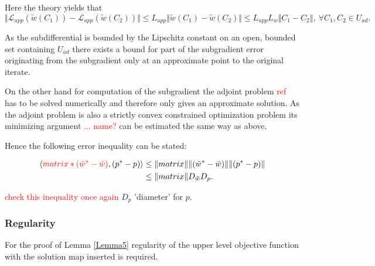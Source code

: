 Here the theory yields that
\[ \Vert \mathcal{L}_{upp}(\tilde{w}(C_1))-\mathcal{L}_{upp}(\tilde{w}(C_2)) \Vert \leq L_{upp}\Vert \tilde{w}(C_1)-\tilde{w}(C_2) \Vert \leq  L_{upp} L_{w}\Vert C_1-C_2\Vert, \ \forall C_1, C_2 \in U_{ad}. \]

As the subdifferential is bounded by the Lipschitz constant on an open, bounded set containing \(U_{ad}\) there exists a bound for part of the subgradient error originating from the subgradient only at an approximate point to the original iterate.

On the other hand for computation of the subgradient the adjoint problem \textcolor{red}{ref} has to be solved numerically and therefore only gives an approximate solution.
As the adjoint problem is also a strictly convex constrained optimization problem its minimizing argument \textcolor{red}{... name?} can be estimated the same way as above.

Hence the following error inequality can be stated:

\begin{align*}
	\left\langle \textcolor{red}{matrix*(\tilde{w}^*-\tilde{w})}, (p^*-p) \right\rangle &\leq \Vert matrix \Vert \Vert(\tilde{w}^*-\tilde{w}) \Vert \Vert (p^*-p) \Vert \\
	& \leq \Vert matrix \Vert D_{\tilde{w}} D_{p}.
\end{align*}

\textcolor{red}{check this inequality once again}
\(D_{p}\) 'diameter' for \(p\).



\subsubsection{Regularity}

For the proof of Lemma \ref{Lemma5} regularity of the upper level objective function with the solution map inserted is required.

